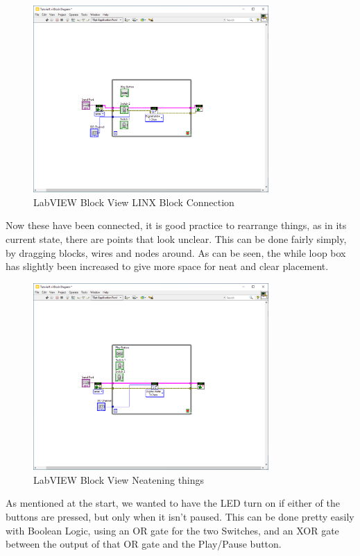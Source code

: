 \documentclass[a4paper,11pt]{report}
\begin{document}
\begin{figure}[H]
\centering
\includegraphics[width=0.8\textwidth]{screenshots/labview22}
\caption{LabVIEW Block View LINX Block Connection}
\end{figure}

Now these have been connected, it is good practice to rearrange things, as in its current state, there are points that look unclear. This can be done fairly simply, by dragging blocks, wires and nodes around. As can be seen, the while loop box has slightly been increased to give more space for neat and clear placement.

\begin{figure}[H]
\centering
\includegraphics[width=0.8\textwidth]{screenshots/labview23}
\caption{LabVIEW Block View Neatening things}
\end{figure}

As mentioned at the start, we wanted to have the LED turn on if either of the buttons are pressed, but only when it isn't paused. This can be done pretty easily with Boolean Logic, using an OR gate for the two Switches, and an XOR gate between the output of that OR gate and the Play/Pause button.
\end{document}
